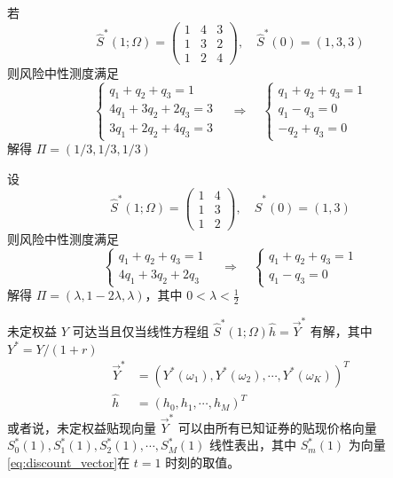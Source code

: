 \begin{example}\label{exa:three-assets}
    若
    \[
    \hat{S}^*(1;\Omega)=\begin{pmatrix}
        1&4&3\\
        1&3&2\\
        1&2&4
    \end{pmatrix},\quad 
    \hat{S}^*(0)=(1,3,3)
    \]
    则风险中性测度满足
    \[
    \begin{cases}
        q_1+q_2+q_3=1\\
        4q_1+3q_2+2q_3=3\\
        3q_1+2q_2+4q_3=3
    \end{cases}\quad\Rightarrow\quad
    \begin{cases}
        q_1+q_2+q_3=1\\
        q_1-q_3=0\\
        -q_2+q_3=0
    \end{cases}
    \]
    解得 $\Pi=(1/3,1/3,1/3)$
\end{example}

\begin{example}\label{exa:two-assets}
    设
    \[
    \hat{S}^*(1;\Omega)=\begin{pmatrix}
        1 & 4\\ 1&3\\1&2
    \end{pmatrix},\quad \hat{S}^*(0)=(1,3)
    \]
    则风险中性测度满足
    \[
    \begin{cases}
        q_1+q_2+q_3=1\\
        4q_1+3q_2+2q_3
    \end{cases} \quad \Rightarrow \quad 
    \begin{cases}
        q_1+q_2+q_3=1\\
        q_1-q_3=0
    \end{cases}
    \]
    解得 $\Pi=(\lambda,1-2\lambda,\lambda)$，其中 $0<\lambda<\frac{1}{2}$
\end{example}

未定权益 $Y$ 可达当且仅当线性方程组 $\hat{S}^*(1;\Omega) \hat{h}=\overrightarrow{Y}^*$ 有解，其中 $Y^*=Y/(1+r)$
\[
\begin{aligned}
    \overrightarrow{Y}^*&=(Y^*(\omega_1), Y^*(\omega_2), \cdots, Y^*(\omega_K))^T\\
    \hat{h}&=(h_0,h_1,\cdots,h_M)^T
\end{aligned}
\]
或者说，未定权益贴现向量 $\overrightarrow{Y}^*$ 可以由所有已知证券的贴现价格向量 $S^*_0(1), S^*_1(1), S^*_2(1),\cdots,S^*_M(1)$ 线性表出，其中 $S_m^*(1)$ 为向量\eqref{eq:discount_vector}在 $t=1$ 时刻的取值。

